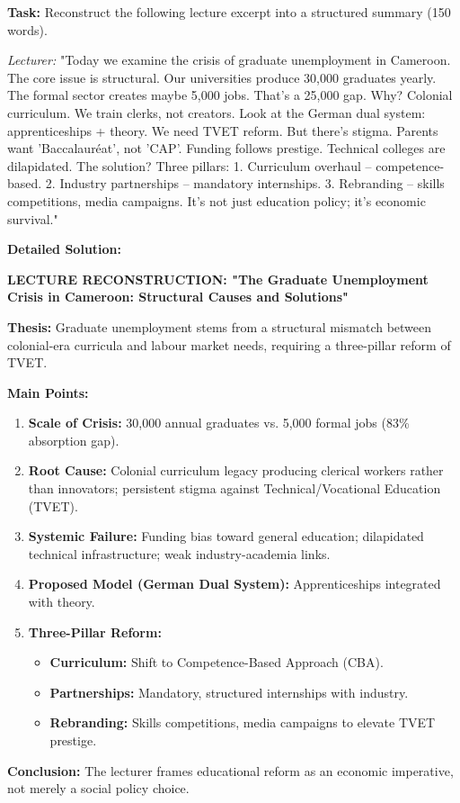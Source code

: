\documentclass[11pt]{article}
\begin{document}
\begin{exoresolu}
\textbf{Task:} Reconstruct the following lecture excerpt into a structured summary (150 words).

\textit{Lecturer:} "Today we examine the crisis of graduate unemployment in Cameroon. The core issue is structural. Our universities produce 30,000 graduates yearly. The formal sector creates maybe 5,000 jobs. That's a 25,000 gap. Why? Colonial curriculum. We train clerks, not creators. Look at the German dual system: apprenticeships + theory. We need TVET reform. But there's stigma. Parents want 'Baccalauréat', not 'CAP'. Funding follows prestige. Technical colleges are dilapidated. The solution? Three pillars: 1. Curriculum overhaul -- competence-based. 2. Industry partnerships -- mandatory internships. 3. Rebranding -- skills competitions, media campaigns. It's not just education policy; it's economic survival."

\tcblower
\textbf{Detailed Solution:}

\textbf{LECTURE RECONSTRUCTION: "The Graduate Unemployment Crisis in Cameroon: Structural Causes and Solutions"}

\textbf{Thesis:} Graduate unemployment stems from a structural mismatch between colonial-era curricula and labour market needs, requiring a three-pillar reform of TVET.

\textbf{Main Points:}
\begin{enumerate}
    \item \textbf{Scale of Crisis:} 30,000 annual graduates vs. 5,000 formal jobs (83\% absorption gap).
    \item \textbf{Root Cause:} Colonial curriculum legacy producing clerical workers rather than innovators; persistent stigma against Technical/Vocational Education (TVET).
    \item \textbf{Systemic Failure:} Funding bias toward general education; dilapidated technical infrastructure; weak industry-academia links.
    \item \textbf{Proposed Model (German Dual System):} Apprenticeships integrated with theory.
    \item \textbf{Three-Pillar Reform:}
    \begin{itemize}
        \item \textbf{Curriculum:} Shift to Competence-Based Approach (CBA).
        \item \textbf{Partnerships:} Mandatory, structured internships with industry.
        \item \textbf{Rebranding:} Skills competitions, media campaigns to elevate TVET prestige.
    \end{itemize}
\end{enumerate}

\textbf{Conclusion:} The lecturer frames educational reform as an economic imperative, not merely a social policy choice.
\end{exoresolu}
\end{document}

